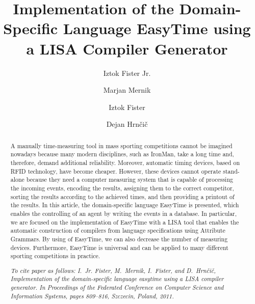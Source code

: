 \documentclass[preprint, prX]{revtex4}
\begin{document}
\begin{abstract}
A manually time-measuring tool in mass sporting competitions cannot be imagined nowadays because many modern disciplines, such as
IronMan, take a long time and, therefore, demand additional reliability. Moreover, automatic timing devices, based on RFID technology,
have become cheaper. However, these devices cannot operate stand-alone because they need a computer measuring system that is capable of
processing the incoming events, encoding the results, assigning them to the correct competitor, sorting the results according to the
achieved times, and then providing a printout of the results. In this article, the domain-specific language EasyTime is presented, which enables the controlling of an agent by writing the events in a database. In particular, we are focused on the implementation of EasyTime with a LISA tool that enables the automatic construction of compilers from language specifications using Attribute Grammars. By using of EasyTime, we can also decrease the number of measuring devices. Furthermore, EasyTime is universal and can be applied to many different
sporting competitions in practice.

\textit{To cite paper as follows: I.~Jr. Fister, M.~Mernik, I.~Fister, and D.~Hrn\v{c}i\v{c},
Implementation of the domain-specific language easytime using a
{LISA} compiler generator. In {\em Proceedings of the Federated Conference on Computer Science
  and Information Systems}, pages 809--816, Szczecin, Poland, 2011.
}

\end{abstract}

\title{Implementation of the Domain-Specific Language EasyTime using a LISA Compiler Generator}

\author{Iztok Fister Jr.}

\author{Marjan Mernik}

\author{Iztok Fister}

\author{Dejan Hrn\v{c}i\v{c}}
\end{document}

